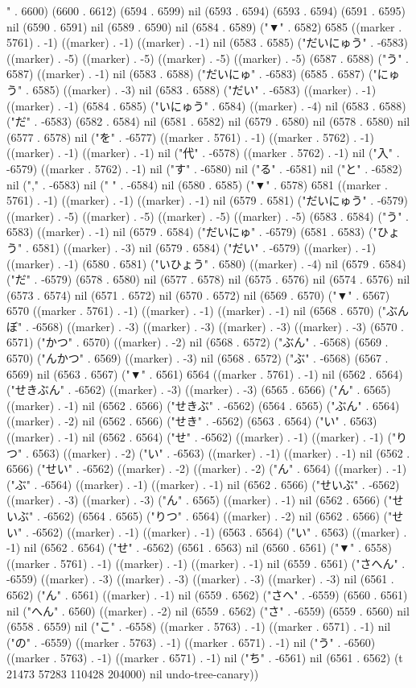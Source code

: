 " . 6600) (6600 . 6612) (6594 . 6599) nil (6593 . 6594) (6593 . 6594) (6591 . 6595) nil (6590 . 6591) nil (6589 . 6590) nil (6584 . 6589) ("▼" . 6582) 6585 ((marker . 5761) . -1) ((marker) . -1) ((marker) . -1) nil (6583 . 6585) ("だいにゅう" . -6583) ((marker) . -5) ((marker) . -5) ((marker) . -5) ((marker) . -5) (6587 . 6588) ("う" . 6587) ((marker) . -1) nil (6583 . 6588) ("だいにゅ" . -6583) (6585 . 6587) ("にゅう" . 6585) ((marker) . -3) nil (6583 . 6588) ("だい" . -6583) ((marker) . -1) ((marker) . -1) (6584 . 6585) ("いにゅう" . 6584) ((marker) . -4) nil (6583 . 6588) ("だ" . -6583) (6582 . 6584) nil (6581 . 6582) nil (6579 . 6580) nil (6578 . 6580) nil (6577 . 6578) nil ("を" . -6577) ((marker . 5761) . -1) ((marker . 5762) . -1) ((marker) . -1) ((marker) . -1) nil ("代" . -6578) ((marker . 5762) . -1) nil ("入" . -6579) ((marker . 5762) . -1) nil ("す" . -6580) nil ("る" . -6581) nil ("と" . -6582) nil ("," . -6583) nil (" " . -6584) nil (6580 . 6585) ("▼" . 6578) 6581 ((marker . 5761) . -1) ((marker) . -1) ((marker) . -1) nil (6579 . 6581) ("だいにゅう" . -6579) ((marker) . -5) ((marker) . -5) ((marker) . -5) ((marker) . -5) (6583 . 6584) ("う" . 6583) ((marker) . -1) nil (6579 . 6584) ("だいにゅ" . -6579) (6581 . 6583) ("ひょう" . 6581) ((marker) . -3) nil (6579 . 6584) ("だい" . -6579) ((marker) . -1) ((marker) . -1) (6580 . 6581) ("いひょう" . 6580) ((marker) . -4) nil (6579 . 6584) ("だ" . -6579) (6578 . 6580) nil (6577 . 6578) nil (6575 . 6576) nil (6574 . 6576) nil (6573 . 6574) nil (6571 . 6572) nil (6570 . 6572) nil (6569 . 6570) ("▼" . 6567) 6570 ((marker . 5761) . -1) ((marker) . -1) ((marker) . -1) nil (6568 . 6570) ("ぶんぼ" . -6568) ((marker) . -3) ((marker) . -3) ((marker) . -3) ((marker) . -3) (6570 . 6571) ("かつ" . 6570) ((marker) . -2) nil (6568 . 6572) ("ぶん" . -6568) (6569 . 6570) ("んかつ" . 6569) ((marker) . -3) nil (6568 . 6572) ("ぶ" . -6568) (6567 . 6569) nil (6563 . 6567) ("▼" . 6561) 6564 ((marker . 5761) . -1) nil (6562 . 6564) ("せきぶん" . -6562) ((marker) . -3) ((marker) . -3) (6565 . 6566) ("ん" . 6565) ((marker) . -1) nil (6562 . 6566) ("せきぶ" . -6562) (6564 . 6565) ("ぶん" . 6564) ((marker) . -2) nil (6562 . 6566) ("せき" . -6562) (6563 . 6564) ("い" . 6563) ((marker) . -1) nil (6562 . 6564) ("せ" . -6562) ((marker) . -1) ((marker) . -1) ("りつ" . 6563) ((marker) . -2) ("い" . -6563) ((marker) . -1) ((marker) . -1) nil (6562 . 6566) ("せい" . -6562) ((marker) . -2) ((marker) . -2) ("ん" . 6564) ((marker) . -1) ("ぶ" . -6564) ((marker) . -1) ((marker) . -1) nil (6562 . 6566) ("せいぶ" . -6562) ((marker) . -3) ((marker) . -3) ("ん" . 6565) ((marker) . -1) nil (6562 . 6566) ("せいぶ" . -6562) (6564 . 6565) ("りつ" . 6564) ((marker) . -2) nil (6562 . 6566) ("せい" . -6562) ((marker) . -1) ((marker) . -1) (6563 . 6564) ("い" . 6563) ((marker) . -1) nil (6562 . 6564) ("せ" . -6562) (6561 . 6563) nil (6560 . 6561) ("▼" . 6558) ((marker . 5761) . -1) ((marker) . -1) ((marker) . -1) nil (6559 . 6561) ("さへん" . -6559) ((marker) . -3) ((marker) . -3) ((marker) . -3) ((marker) . -3) nil (6561 . 6562) ("ん" . 6561) ((marker) . -1) nil (6559 . 6562) ("さへ" . -6559) (6560 . 6561) nil ("へん" . 6560) ((marker) . -2) nil (6559 . 6562) ("さ" . -6559) (6559 . 6560) nil (6558 . 6559) nil ("こ" . -6558) ((marker . 5763) . -1) ((marker . 6571) . -1) nil ("の" . -6559) ((marker . 5763) . -1) ((marker . 6571) . -1) nil ("う" . -6560) ((marker . 5763) . -1) ((marker . 6571) . -1) nil ("ち" . -6561) nil (6561 . 6562) (t 21473 57283 110428 204000) nil undo-tree-canary))
